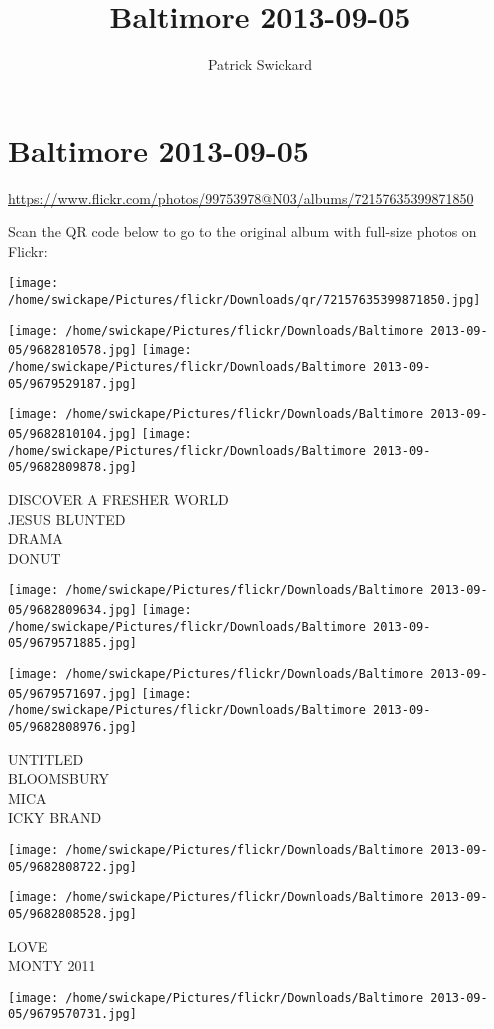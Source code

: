 \documentclass[10pt,letterpaper]{article}
\title{Baltimore 2013-09-05}
\author{Patrick Swickard}
\date{}
\begin{document}
\section*{Baltimore 2013-09-05}

\url{https://www.flickr.com/photos/99753978@N03/albums/72157635399871850}

Scan the QR code below to go to the original album with full-size photos on Flickr:

\texttt{[image: /home/swickape/Pictures/flickr/Downloads/qr/72157635399871850.jpg]}
\pagebreak

\texttt{[image: /home/swickape/Pictures/flickr/Downloads/Baltimore 2013-09-05/9682810578.jpg]}
\texttt{[image: /home/swickape/Pictures/flickr/Downloads/Baltimore 2013-09-05/9679529187.jpg]}

\texttt{[image: /home/swickape/Pictures/flickr/Downloads/Baltimore 2013-09-05/9682810104.jpg]}
\texttt{[image: /home/swickape/Pictures/flickr/Downloads/Baltimore 2013-09-05/9682809878.jpg]}

DISCOVER A FRESHER WORLD\\
JESUS BLUNTED\\
DRAMA\\
DONUT
\pagebreak

\texttt{[image: /home/swickape/Pictures/flickr/Downloads/Baltimore 2013-09-05/9682809634.jpg]}
\texttt{[image: /home/swickape/Pictures/flickr/Downloads/Baltimore 2013-09-05/9679571885.jpg]}

\texttt{[image: /home/swickape/Pictures/flickr/Downloads/Baltimore 2013-09-05/9679571697.jpg]}
\texttt{[image: /home/swickape/Pictures/flickr/Downloads/Baltimore 2013-09-05/9682808976.jpg]}

UNTITLED\\
BLOOMSBURY\\
MICA\\
ICKY BRAND
\pagebreak

\texttt{[image: /home/swickape/Pictures/flickr/Downloads/Baltimore 2013-09-05/9682808722.jpg]}

\vspace{0.25in}
\texttt{[image: /home/swickape/Pictures/flickr/Downloads/Baltimore 2013-09-05/9682808528.jpg]}

LOVE\\
MONTY 2011
\pagebreak

\texttt{[image: /home/swickape/Pictures/flickr/Downloads/Baltimore 2013-09-05/9679570731.jpg]}
\end{document}
